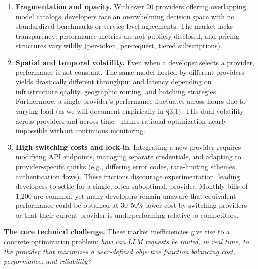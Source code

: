 \documentclass[english]{article}
\begin{document}
\begin{enumerate}
\item \textbf{Fragmentation and opacity.} With over 20 providers offering overlapping model catalogs, developers face an overwhelming decision space with no standardized benchmarks or service-level agreements. The market lacks transparency: performance metrics are not publicly disclosed, and pricing structures vary wildly (per-token, per-request, tiered subscriptions).

\item \textbf{Spatial and temporal volatility.} Even when a developer selects a provider, performance is not constant. The same model hosted by different providers yields drastically different throughput and latency depending on infrastructure quality, geographic routing, and batching strategies. Furthermore, a single provider's performance fluctuates across hours due to varying load (as we will document empirically in §3.1). This dual volatility—across providers and across time—makes rational optimization nearly impossible without continuous monitoring.

\item \textbf{High switching costs and lock-in.} Integrating a new provider requires modifying API endpoints, managing separate credentials, and adapting to provider-specific quirks (e.g., differing error codes, rate-limiting schemes, authentication flows). These frictions discourage experimentation, leading developers to settle for a single, often suboptimal, provider. Monthly bills of --1,200 are common, yet many developers remain unaware that equivalent performance could be obtained at 30--50\% lower cost by switching providers—or that their current provider is underperforming relative to competitors.
\end{enumerate}

\medskip

\noindent\textbf{The core technical challenge.}
These market inefficiencies give rise to a concrete optimization problem: \emph{how can LLM requests be routed, in real time, to the provider that maximizes a user-defined objective function balancing cost, performance, and reliability?}
\end{document}
